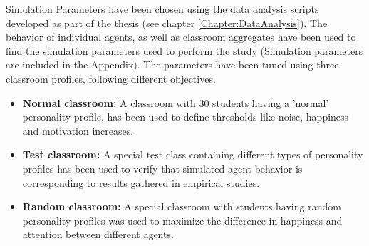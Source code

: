 \bb

Simulation Parameters have been chosen using the data analysis scripts developed
as part of the thesis (see chapter \ref{Chapter:DataAnalysis}). The behavior
of individual agents, as well as classroom aggregates have been used to find
the simulation parameters used to perform the study (Simulation parameters are included
in the Appendix). The parameters have been tuned using three classroom profiles,
following different objectives.

\begin{itemize}
    \item \textbf{Normal classroom:} A classroom with 30 students having a 'normal'
    personality profile, has been used to define thresholds like noise, happiness
    and motivation increases.
    \item \textbf{Test classroom:} A special test class containing different types of
    personality profiles has been used to verify that simulated agent behavior is
    corresponding to results gathered in empirical studies.
    \item \textbf{Random classroom:} A special classroom with students having random
    personality profiles was used to maximize the difference in happiness and attention
    between different agents.
\end{itemize}
